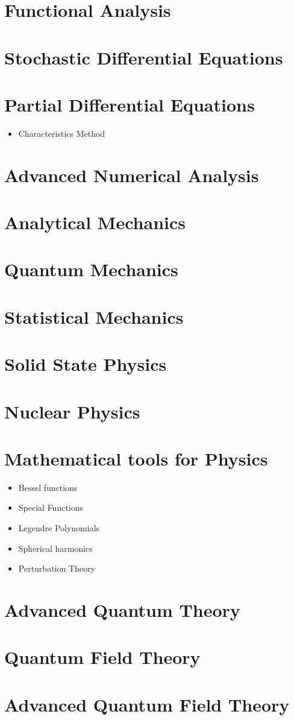 \documentclass[10pt]{article}
\begin{document}
\section{Functional Analysis}
\section{Stochastic Differential Equations}
\section{Partial Differential Equations}
\begin{itemize}
	\item Characteristics Method
\end{itemize}
\section{Advanced Numerical Analysis}
\section{Analytical Mechanics}
\section{Quantum Mechanics}
\section{Statistical Mechanics}
\section{Solid State Physics}
\section{Nuclear Physics}
\section{Mathematical tools for Physics}
\begin{itemize}
	\item Bessel functions
	\item Special Functions
	\item Legendre Polynomials
	\item Spherical harmonics
	\item Perturbation Theory
\end{itemize}
\section{Advanced Quantum Theory}
\section{Quantum Field Theory}
\section{Advanced Quantum Field Theory}
\end{document}

